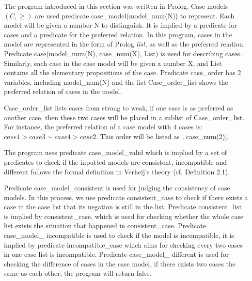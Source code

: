 \documentclass{IOS-Book-Article}
\begin{document}


\noindent The program introduced in this section was written in Prolog. Case models $(C, \geq)$ are used predicate {\mf case\_model(model\_num(N))} to represent. Each model will be given a number N to distinguish. It is implied by a predicate for cases and a predicate for the preferred relation. In this program, cases in the model are represented in the form of Prolog \textit{list}, as well as the preferred relation. Predicate {\mf case(model\_num(N), case\_num(X), List)} is used for describing cases. Similarly, each case in the case model will be given a number {\mf X}, and {\mf List} contains all the elementary propositions of the case. Predicate {\mf case\_order} has 2 variables, including {\mf model\_num(N)} and the list {\mf Case\_order\_list} shows the preferred relation of cases in the model. 

{\mf Case\_order\_list} lists cases from strong to weak, if one case is as preferred as another case, then these two cases will be placed in a sublist of {\mf Case\_order\_list}. For instance, the preferred relation of a case model with 4 cases is: $case 1 > case 3 \sim case 4 > case 2$. This order will be listed as {\mf [case\_num(1), [case\_num(3), case\_num(4)], case\_num(2)]}.

The program uses predicate {\mf case\_model\_valid} which is implied by a set of predicates to check if the inputted models are consistent, incompatible and different follows the formal definition in Verheij's theory (cf. Definition 2.1).

Predicate {\mf case\_model\_consistent} is used for judging the consistency of case models. In this process, we use predicate {\mf consistent\_case} to check if there exists a case in the case list that its negation is still in the list. Predicate {\mf consistent\_list} is implied by {\mf consistent\_case}, which is used for checking whether the whole case list exists the situation that happened in {\mf consistent\_case}. Predicate {\mf case\_model\_ incompatible} is used to check if the model is incompatible, it is implied by predicate {\mf incompatible\_case} which aims for checking every two cases in one case list is incompatible. Predicate {\mf case\_model\_ different} is used for checking the difference of cases in the case model, if there exists two cases the same as each other, the program will return {\mf false}.
\end{document}
